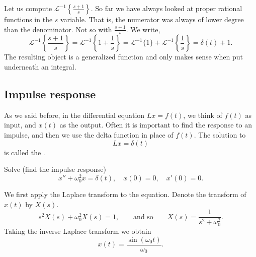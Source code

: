 \begin{example}
Let us compute ${\mathcal{L}}^{-1} \left\{ \frac{s+1}{s} \right\}$.  So
far we have always looked at proper rational functions in the $s$ variable.
That is, the numerator was always of lower degree than the denominator.
Not so with $\frac{s+1}{s}$.
We write,
\begin{equation*}
{\mathcal{L}}^{-1} \left\{ \frac{s+1}{s} \right\}
=
{\mathcal{L}}^{-1} \left\{ 1 + \frac{1}{s} \right\}
=
{\mathcal{L}}^{-1} \{ 1 \}
+
{\mathcal{L}}^{-1} \left\{ \frac{1}{s} \right\}
=
\delta(t) + 1 .
\end{equation*}
The resulting object is a generalized
function and only makes sense when put underneath an integral.
\end{example}

\subsection{Impulse response}

As we said before, in the differential equation
$L x = f(t)$,
we think of $f(t)$ as input, and $x(t)$ as the output.  Often it is important
to find the response to an impulse, and then we use
the delta function in place of $f(t)$.
The solution to
\begin{equation*}
L x = \delta(t)
\end{equation*}
is called the
\emph{}.

\begin{example}
Solve (find the impulse response)
\begin{equation} \label{eq:lteximpulseresp}
x'' + \omega_0^2 x = \delta(t) , \quad x(0) = 0, \quad x'(0) = 0 .
\end{equation}

We first apply the Laplace transform to the equation.  Denote
the transform of $x(t)$ by $X(s)$.
\begin{equation*}
s^2 X(s) + \omega_0^2 X(s) = 1 ,
\qquad \text{and so} \qquad
X(s) = \frac{1}{s^2+ \omega_0^2} .
\end{equation*}
Taking the inverse Laplace transform we obtain
\begin{equation*}
x(t) = 
\frac{\sin (\omega_0 t)}{\omega_0} .
\end{equation*}
\end{example}

